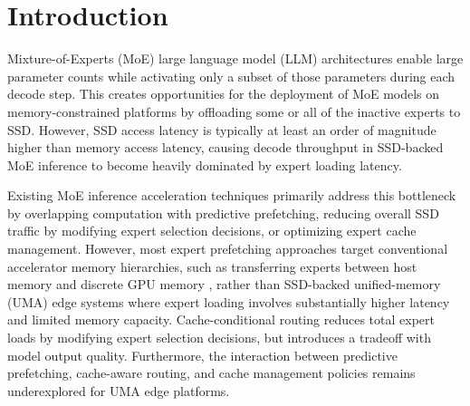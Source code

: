 \section{Introduction}

Mixture-of-Experts (MoE) large language model (LLM) architectures enable large parameter counts while activating only a subset of those parameters during each decode step. This creates opportunities for the deployment of MoE models on memory-constrained platforms by offloading some or all of the inactive experts to SSD. However, SSD access latency is typically at least an order of magnitude higher than memory access latency, causing decode throughput in SSD-backed MoE inference to become heavily dominated by expert loading latency.

Existing MoE inference acceleration techniques primarily address this bottleneck by overlapping computation with predictive prefetching, reducing overall SSD traffic by modifying expert selection decisions, or optimizing expert cache management. However, most expert prefetching approaches target conventional accelerator memory hierarchies, such as transferring experts between host memory and discrete GPU memory \cite{xue2025moeinfinityefficientmoeinference,gavhane2025moebeyondlearningbasedexpertactivation,song2025promoefastmoebasedllm}, rather than SSD-backed unified-memory (UMA) edge systems where expert loading involves substantially higher latency and limited memory capacity. Cache-conditional routing \cite{skliar2025mixturecacheconditionalexpertsefficient, zhu2026smoealgorithmsystemcodesignpushing} reduces total expert loads by modifying expert selection decisions, but introduces a tradeoff with model output quality. Furthermore, the interaction between predictive prefetching, cache-aware routing, and cache management policies remains underexplored for UMA edge platforms.

